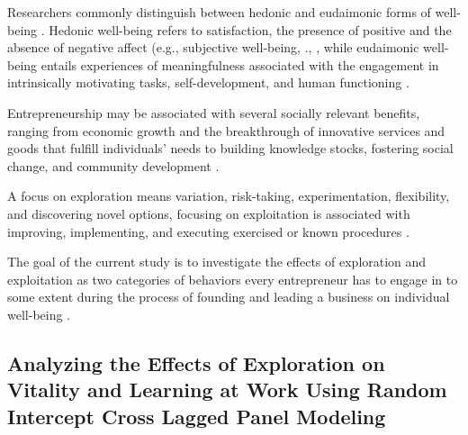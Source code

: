 \documentclass[man]{apa7}
\begin{document}
Researchers commonly distinguish between hedonic and eudaimonic forms of well-being \parencite[e.g.,][]{Ryan2001}. 
Hedonic well-being refers to satisfaction, the presence of positive and the absence of negative aﬀect (e.g., subjective well-being, \citeauthor{Diener.1984}., \citeyear{Diener.1984}, while eudaimonic well-being entails experiences of meaningfulness associated with the engagement in intrinsically motivating tasks, self-development, and human functioning \parencite[e.g.,][]{Ryan2001}. 

Entrepreneurship may be associated with several socially relevant benefits, ranging from economic growth and the breakthrough of innovative services and goods that fulfill individuals' needs to building knowledge stocks, fostering social change, and community development \parencite[e.g.,][]{Wiklund.2019, Zahra2016, Acs2013}. 

A focus on exploration means variation, risk-taking, experimentation, flexibility, and discovering novel options, focusing on exploitation is associated with improving, implementing, and executing exercised or known procedures \parencite{March.1991, Good.2013}.

The goal of the current study is to investigate the effects of exploration and exploitation as two categories of behaviors every entrepreneur has to engage in to some extent during the process of founding and leading a business on individual well-being \parencite{Siren.2012, Uotila2009, DuaneIreland2007, Rosing.2017}.


\subsection{Analyzing the Effects of Exploration on Vitality and Learning at Work Using Random Intercept Cross Lagged Panel Modeling}
\end{document}
